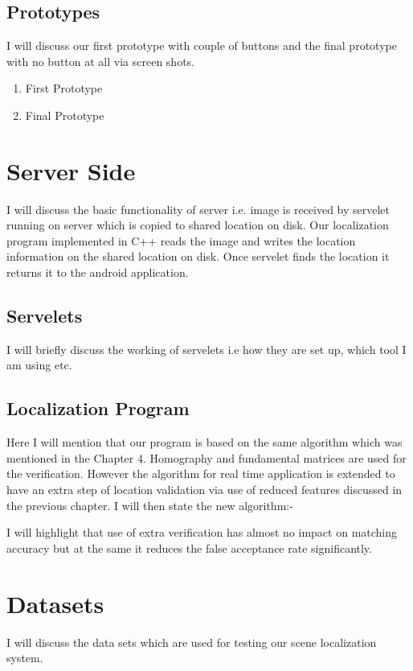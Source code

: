 \subsection{Prototypes}
I will discuss our first prototype with couple of buttons and 
the final prototype with no button at all 
via screen shots.
\begin{enumerate}
\item First Prototype
\item Final Prototype
\end{enumerate}

\section{Server Side}
I will discuss the basic functionality of server i.e. image is received 
by servelet running on server which is copied to shared location on disk. 
Our localization program implemented in C++ 
reads the image and writes the location 
information on the shared location on disk. Once servelet finds the 
location it returns it to the android application. 


\subsection{Servelets}
I will briefly discuss the working of servelets i.e 
how they are set up, which tool I am using etc.

\subsection{Localization Program}
Here I will mention that our program is based on the 
same algorithm which was mentioned in the Chapter 4.
Homography and fundamental matrices are used 
for the verification. However the algorithm for real time 
application is extended 
to have an extra step of location validation via use of 
reduced features discussed in the previous 
chapter. I will then state the 
new algorithm:-

I will highlight that use of extra verification has almost no 
impact on matching accuracy but at the same it reduces the 
false acceptance rate significantly.  


\section{Datasets}
I will discuss the data sets which are used 
for testing our scene localization system.

